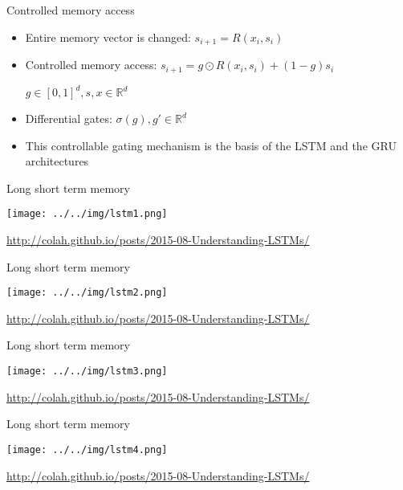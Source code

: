\documentclass[usenames,dvipsnames,handout,aspectratio=169]{beamer}
\begin{document}
\begin{frame}{Controlled memory access}
\begin{itemize}
	\item Entire memory vector is changed: $s_{i+1} = R(x_i, s_i)$
	\item Controlled memory access: $s_{i+1} = g \odot R(x_i, s_i) + (1-g) s_i$
	
	$g \in [0,1]^d,  s,x \in \mathbb{R}^d$
	\item Differential gates: $\sigma(g), g' \in \mathbb{R}^d$
	\item This controllable gating mechanism is the basis of the LSTM and the GRU architectures
	
\end{itemize}	
\end{frame}

\begin{frame}{Long short term memory}
\begin{center}
\texttt{[image: ../../img/lstm1.png]}
\end{center}

\url{http://colah.github.io/posts/2015-08-Understanding-LSTMs/}	
\end{frame}


\begin{frame}{Long short term memory}
\begin{center}
\texttt{[image: ../../img/lstm2.png]}
\end{center}

\url{http://colah.github.io/posts/2015-08-Understanding-LSTMs/}	
\end{frame}

\begin{frame}{Long short term memory}
\begin{center}
\texttt{[image: ../../img/lstm3.png]}
\end{center}

\url{http://colah.github.io/posts/2015-08-Understanding-LSTMs/}	
\end{frame}


\begin{frame}{Long short term memory}
\begin{center}
\texttt{[image: ../../img/lstm4.png]}
\end{center}

\url{http://colah.github.io/posts/2015-08-Understanding-LSTMs/}	
\end{frame}
\end{document}
